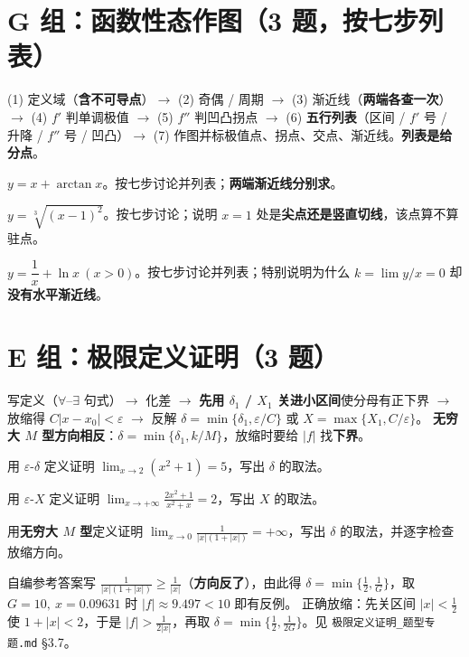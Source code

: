 \documentclass[11pt,a4paper]{ctexart}
\newcommand{\eps}{\varepsilon}
\newcommand{\abs}[1]{\left\lvert #1\right\rvert}
\begin{document}
\section{G 组：函数性态作图（3 题，按七步列表）}

\begin{methodbox}[七步不可省]
(1) 定义域（\textbf{含不可导点}）$\to$ (2) 奇偶 / 周期 $\to$ (3) 渐近线（\textbf{两端各查一次}）$\to$
(4) $f'$ 判单调极值 $\to$ (5) $f''$ 判凹凸拐点 $\to$ (6) \textbf{五行列表}（区间 / $f'$ 号 / 升降 / $f''$ 号 / 凹凸）$\to$
(7) 作图并标极值点、拐点、交点、渐近线。\textbf{列表是给分点}。
\end{methodbox}

\begin{qlist}
\item $y=x+\arctan x$。按七步讨论并列表；\textbf{两端渐近线分别求}。
\item $y=\sqrt[3]{(x-1)^2}$。按七步讨论；说明 $x=1$ 处是\textbf{尖点还是竖直切线}，该点算不算驻点。
\item $y=\dfrac1x+\ln x\ (x>0)$。按七步讨论并列表；特别说明为什么 $k=\lim y/x=0$ 却\textbf{没有水平渐近线}。
\end{qlist}

\section{E 组：极限定义证明（3 题）}

\begin{methodbox}[五步骨架]
写定义（$\forall$--$\exists$ 句式）$\to$ 化差 $\to$ \textbf{先用 $\delta_1$ / $X_1$ 关进小区间}使分母有正下界 $\to$
放缩得 $C\abs{x-x_0}<\eps$ $\to$ 反解 $\delta=\min\{\delta_1,\eps/C\}$ 或 $X=\max\{X_1,C/\eps\}$。
\textbf{无穷大 $M$ 型方向相反}：$\delta=\min\{\delta_1,k/M\}$，放缩时要给 $\abs f$ 找\textbf{下界}。
\end{methodbox}

\begin{qlist}
\item 用 $\eps$-$\delta$ 定义证明 $\displaystyle\lim_{x\to2}(x^2+1)=5$，写出 $\delta$ 的取法。
\item 用 $\eps$-$X$ 定义证明 $\displaystyle\lim_{x\to+\infty}\frac{2x^2+1}{x^2+x}=2$，写出 $X$ 的取法。
\item 用\textbf{无穷大 $M$ 型}定义证明 $\displaystyle\lim_{x\to0}\frac1{\abs{x}\left(1+\abs{x}\right)}=+\infty$，写出 $\delta$ 的取法，并逐字检查放缩方向。
\end{qlist}

\begin{warnbox}[E3 就是 2024-25 第 11 题答案册栽跟头的地方]
自编参考答案写 $\frac1{|x|(1+|x|)}\geq\frac1{|x|}$（\textbf{方向反了}），由此得 $\delta=\min\{\frac12,\frac1G\}$，取 $G=10,\ x=0.09631$ 时 $\abs f\approx9.497<10$ 即有反例。
正确放缩：先关区间 $\abs{x}<\frac12$ 使 $1+\abs{x}<2$，于是 $\abs f>\frac1{2\abs x}$，再取 \textbf{$\delta=\min\{\frac12,\frac1{2G}\}$}。见 \texttt{极限定义证明\_题型专题.md} \S 3.7。
\end{warnbox}
\end{document}
